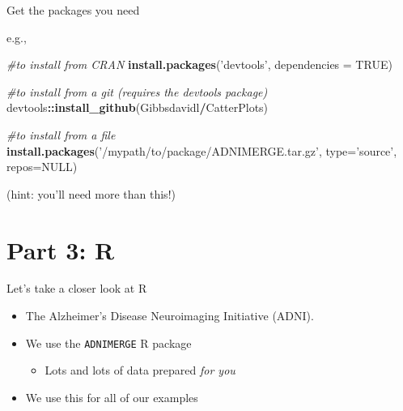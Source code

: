 \documentclass[ignorenonframetext,]{beamer}
\newenvironment{Shaded}{\begin{snugshade}}{\end{snugshade}}
\newcommand{\CommentTok}[1]{\textcolor[rgb]{0.56,0.35,0.01}{\textit{#1}}}
\newcommand{\DataTypeTok}[1]{\textcolor[rgb]{0.13,0.29,0.53}{#1}}
\newcommand{\KeywordTok}[1]{\textcolor[rgb]{0.13,0.29,0.53}{\textbf{#1}}}
\newcommand{\NormalTok}[1]{#1}
\newcommand{\OperatorTok}[1]{\textcolor[rgb]{0.81,0.36,0.00}{\textbf{#1}}}
\newcommand{\OtherTok}[1]{\textcolor[rgb]{0.56,0.35,0.01}{#1}}
\newcommand{\StringTok}[1]{\textcolor[rgb]{0.31,0.60,0.02}{#1}}
\providecommand{\tightlist}{%
  \setlength{\itemsep}{0pt}\setlength{\parskip}{0pt}}
\begin{document}
\begin{frame}[fragile]{Get the packages you need}
\protect\hypertarget{get-the-packages-you-need}{}

e.g.,

\begin{Shaded}
\begin{Highlighting}[]
\CommentTok{#to install from CRAN}
\KeywordTok{install.packages}\NormalTok{(}\StringTok{'devtools'}\NormalTok{, }\DataTypeTok{dependencies =} \OtherTok{TRUE}\NormalTok{)}

\CommentTok{#to install from a git  (requires the devtools package)}
\NormalTok{devtools}\OperatorTok{::}\KeywordTok{install_github}\NormalTok{(Gibbsdavidl}\OperatorTok{/}\NormalTok{CatterPlots)}

\CommentTok{#to install from a file}
\KeywordTok{install.packages}\NormalTok{(}\StringTok{'/mypath/to/package/ADNIMERGE.tar.gz'}\NormalTok{, }
                 \DataTypeTok{type=}\StringTok{'source'}\NormalTok{, }\DataTypeTok{repos=}\OtherTok{NULL}\NormalTok{) }
\end{Highlighting}
\end{Shaded}

(hint: you'll need more than this!)

\end{frame}

\hypertarget{part-3-r}{%
\section{Part 3: R}\label{part-3-r}}

\begin{frame}[fragile]{Let's take a closer look at R}
\protect\hypertarget{lets-take-a-closer-look-at-r}{}

\begin{itemize}
\tightlist
\item
  The Alzheimer's Disease Neuroimaging Initiative (ADNI).
\item
  We use the \texttt{ADNIMERGE} R package

  \begin{itemize}
  \tightlist
  \item
    Lots and lots of data prepared \emph{for you}
  \end{itemize}
\item
  We use this for all of our examples
\end{itemize}

\end{frame}
\end{document}
